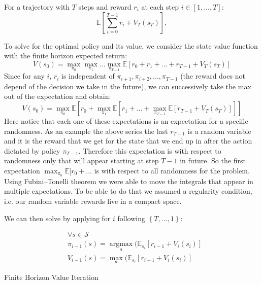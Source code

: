\documentclass{article}
\begin{document}
\begin{defn}
For a trajectory with $T$ steps and reward $r_{i}$ at each step $i \in [1,...,T]$:
\[
\mathbb{E}\left[\sum_{i=0}^{T-1}r_i + V_T(s_T)\right], 
\]
\end{defn}

To solve for the optimal policy and its value, we consider the state value function with the finite horizon expected return: \\
\[
V(s_{0}) = \max_{\pi_{0}}\max_{\pi_{1}}...\max_{\pi_{T-1}}\mathbb{E}[r_{0}+r_{1}+...+r_{T-1}+V_{T}(s_{T})]
\]
Since for any $i$, $r_{i}$ is independent of $\pi_{i+1},\pi_{i+2},...,\pi_{T-1}$ (the reward does not depend of the decision we take in the future), we can successively take the max out of the expectation and obtain:
\[
V(s_{0}) = \max_{\pi_{0}}\mathbb{E}[r_{0}+\max_{\pi_{1}}\mathbb{E}[r_{1}+...+\max_{\pi_{T-1}}\mathbb{E}[r_{T-1}+V_{T}(s_{T})]]]
\]
Here notice that each one of these expectations is an expectation for a specific randomness. As an example the above series the last $r_{T-1}$ is a random variable and it is the reward that we get for the state that we end up in after the action dictated by policy $\pi_{T-1}$. Therefore this expectation is with respect to randomness only that will appear starting at step $T-1$ in future. So the first expectation $\max_{\pi_{0}}\mathbb{E}[r_{0}+ ... $ is with respect to all randomness for the problem. Using Fubini–Tonelli theorem we were able to move the integrals that appear in multiple expectations. To be able to do that we assumed a regularity condition, i.e. our random variable rewards live in a compact space. 

We can then solve by applying for $i$ following $\left\{T,...,1\right\}$:

\begin{align*}
&\forall s\in\mathcal{S} \\
&\pi_{i-1}(s)=\underset{a}{\operatorname{argmax}}(\mathbb{E}_{s_{i}}[r_{i-1}+V_{i}(s_{i})] \\
&V_{i-1}(s)=\max_{a}(\mathbb{E}_{s_{i}}[r_{i-1}+V_{i}(s_{i})]
\end{align*}

\begin{algorithm}[H]
\SetAlgoLined
 \caption{Finite Horizon Value Iteration}
 \label{alg:finite_horizon_VI}
\end{algorithm}
\end{document}
